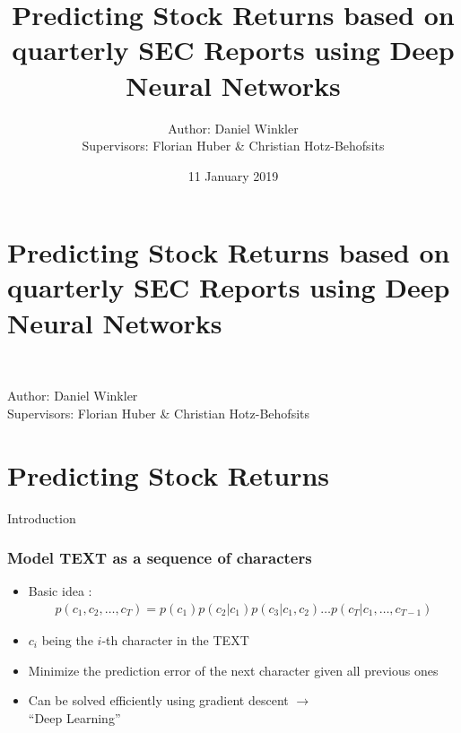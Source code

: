 \documentclass{article}
\title{Predicting Stock Returns based on quarterly SEC Reports using Deep Neural Networks}
\author{Author: Daniel Winkler \\ Supervisors: Florian Huber \& Christian Hotz-Behofsits}
\date{11 January 2019}
\begin{document}
\begin{frame}[plain]
  \titlepage
\end{frame}

\section*{Predicting Stock Returns based on quarterly SEC Reports using Deep Neural Networks} \\
\begin{center}
  Author: Daniel Winkler \\
  Supervisors: Florian Huber \& Christian Hotz-Behofsits
\end{center}
\section{Predicting Stock Returns}
\label{sec:intro}


\begin{frame}{Introduction}
  \begin{itemize}
  \end{itemize}
\end{frame}

\begin{frame}
  \frametitle{Model TEXT as a sequence of characters}
  \begin{itemize}
  \item Basic idea \citep{krause2016mlstm}:\\
    \begin{align*}
      \label{eq:1}
      p(c_1, c_2, \dots, c_T) = p(c_1) p(c_2|c_1) p(c_3 | c_1, c_2) \dots p(c_T|c_1, \dots, c_{T-1})
    \end{align*}
  \item $c_i$ being the $i$-th character in the TEXT
  \item Minimize the prediction error of the next character given all previous ones
  \item Can be solved efficiently using gradient descent $\rightarrow$ \\ ``Deep Learning''
  \end{itemize} 
\end{frame}
\end{document}
